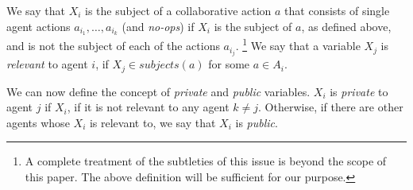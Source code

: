 \documentclass[letterpaper]{article} %
\newcommand{\eliran}[1]{\textbf{[\color{red}ELIRAN:#1]}}
\begin{document}
We say that $X_i$ is the subject of a collaborative action $a$ that consists of single agent actions
$a_{i_1},\ldots,a_{i_k}$ (and {\em no-ops}) if $X_i$ is the subject of $a$, as defined above, and is not the subject of each of the actions $a_{i_j}$.%
\footnote{A complete treatment of the subtleties of this issue is beyond the scope of this paper. The above definition will be sufficient for our purpose.}
%
We say that a variable $X_j$ is \emph{relevant} to agent $i$, if  $X_j\in subjects(a)$ for some $a\in A_i$.

We can now define the concept of {\em private} and {\em public} variables.
$X_i$ is {\em private} to agent $j$ if $X_i$, if it is not relevant to any agent $k\neq j$.
Otherwise, if there are other agents whose $X_i$ is relevant to, we say that $X_i$ is {\em public}. 
\end{document}
